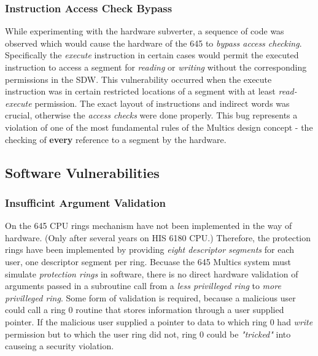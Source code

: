 \subsubsection{Instruction Access Check Bypass}

While experimenting with the hardware subverter, a sequence of code was observed which would cause the hardware 
of the 645 to \textit{bypass access checking}. Specifically the \textit{execute} instruction in certain cases 
would permit the executed instruction to access a segment for \textit{reading} or \textit{writing} without the 
corresponding permissions in the SDW.
This vulnerability occurred when the execute instruction was in certain restricted locations of a segment with 
at least \textit{read-execute} permission.
The exact layout of instructions and indirect words was crucial, otherwise the \textit{access checks} were done 
properly.
This bug represents a violation of one of the most fundamental rules of the Multics design concept - the checking 
of \textbf{every} reference to a segment by the hardware.

\subsection{Software Vulnerabilities}

\subsubsection{Insufficint Argument Validation}

On the 645 CPU rings mechanism have not been implemented in the way of hardware. (Only after several years on HIS 6180 CPU.) 
Therefore, the protection rings have been implemented by providing \textit{eight descriptor segments} for each user, one 
descriptor segment per ring.
Becuase the 645 Multics system must simulate \textit{protection rings} in software, there is no direct hardware 
validation of arguments passed in a subroutine call from a \textit{less privilleged ring} to \textit{more 
privilleged ring}. Some form of validation is required, because a malicious user could call a ring 0 routine 
that stores information through a user supplied pointer.
If the malicious user supplied a pointer to data to which ring 0 had \textit{write} permission but to which the 
user ring did not, ring 0 could be \textit{"tricked"} into causeing a security violation.


